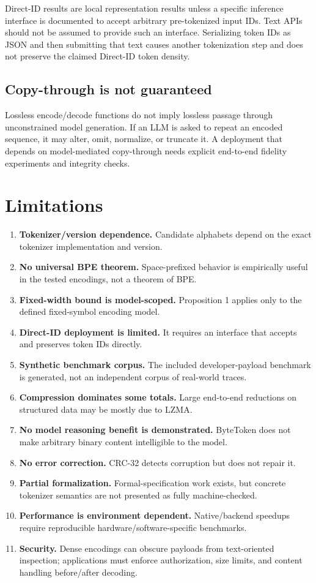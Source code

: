 \documentclass[11pt,a4paper]{article}
\begin{document}
Direct-ID results are local representation results unless a specific inference interface is documented to accept arbitrary pre-tokenized input IDs. Text APIs should not be assumed to provide such an interface. Serializing token IDs as JSON and then submitting that text causes another tokenization step and does not preserve the claimed Direct-ID token density.

\subsection{Copy-through is not guaranteed}

Lossless encode/decode functions do not imply lossless passage through unconstrained model generation. If an LLM is asked to repeat an encoded sequence, it may alter, omit, normalize, or truncate it. A deployment that depends on model-mediated copy-through needs explicit end-to-end fidelity experiments and integrity checks.

\section{Limitations}

\begin{enumerate}
  \item \textbf{Tokenizer/version dependence.} Candidate alphabets depend on the exact tokenizer implementation and version.
  \item \textbf{No universal BPE theorem.} Space-prefixed behavior is empirically useful in the tested encodings, not a theorem of BPE.
  \item \textbf{Fixed-width bound is model-scoped.} Proposition 1 applies only to the defined fixed-symbol encoding model.
  \item \textbf{Direct-ID deployment is limited.} It requires an interface that accepts and preserves token IDs directly.
  \item \textbf{Synthetic benchmark corpus.} The included developer-payload benchmark is generated, not an independent corpus of real-world traces.
  \item \textbf{Compression dominates some totals.} Large end-to-end reductions on structured data may be mostly due to LZMA.
  \item \textbf{No model reasoning benefit is demonstrated.} ByteToken does not make arbitrary binary content intelligible to the model.
  \item \textbf{No error correction.} CRC-32 detects corruption but does not repair it.
  \item \textbf{Partial formalization.} Formal-specification work exists, but concrete tokenizer semantics are not presented as fully machine-checked.
  \item \textbf{Performance is environment dependent.} Native/backend speedups require reproducible hardware/software-specific benchmarks.
  \item \textbf{Security.} Dense encodings can obscure payloads from text-oriented inspection; applications must enforce authorization, size limits, and content handling before/after decoding.
\end{enumerate}
\end{document}
